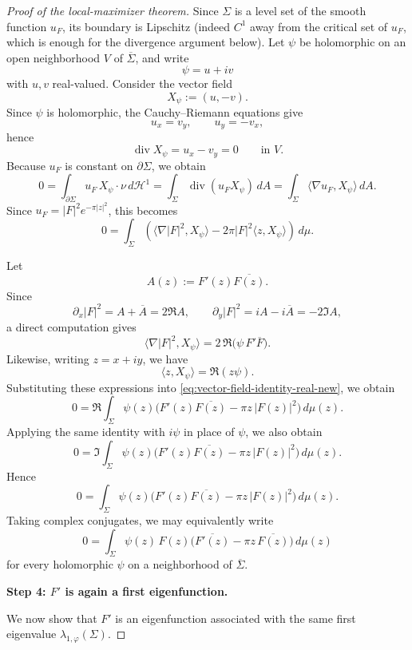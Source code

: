 \documentclass[a4paper,11pt,reqno]{amsart}
\numberwithin{equation}{section}
\theoremstyle{plain} %
\theoremstyle{definition} %
\theoremstyle{remark}
\begin{document}
\begin{proof}[Proof of the local-maximizer theorem]
Since \(\Sigma\) is a level set of the smooth function \(u_F\), its boundary is
Lipschitz (indeed \(C^1\) away from the critical set of \(u_F\), which is enough
for the divergence argument below). Let \(\psi\) be holomorphic on an open
neighborhood \(V\) of \(\overline \Sigma\), and write
\[
\psi=u+iv
\]
with \(u,v\) real-valued. Consider the vector field
\[
X_\psi:=(u,-v).
\]
Since \(\psi\) is holomorphic, the Cauchy--Riemann equations give
\[
u_x=v_y,
\qquad
u_y=-v_x,
\]
hence
\[
\operatorname{div}X_\psi=u_x-v_y=0
\qquad \text{in }V.
\]
Because \(u_F\) is constant on \(\partial \Sigma\), we obtain
\[
0=\int_{\partial \Sigma} u_F\, X_\psi\cdot \nu\, d\mathcal H^1
 =\int_\Sigma \operatorname{div}(u_F X_\psi)\,dA
 =\int_\Sigma \langle \nabla u_F, X_\psi\rangle\,dA.
\]
Since \(u_F=|F|^2e^{-\pi |z|^2}\), this becomes
\begin{equation}\label{eq:vector-field-identity-real-new}
0=
\int_\Sigma
\left(
\langle \nabla |F|^2,X_\psi\rangle
-
2\pi |F|^2 \langle z,X_\psi\rangle
\right)
\,d\mu.
\end{equation}

Let
\[
A(z):=F'(z)\overline{F(z)}.
\]
Since
\[
\partial_x |F|^2 = A+\overline A = 2\Re A,
\qquad
\partial_y |F|^2 = iA-i\overline A = -2\Im A,
\]
a direct computation gives
\[
\langle \nabla |F|^2,X_\psi\rangle
=
2\,\Re\!\big(\psi\,F'\overline{F}\big).
\]
Likewise, writing \(z=x+iy\), we have
\[
\langle z,X_\psi\rangle
=
\Re(z\psi).
\]
Substituting these expressions into
\eqref{eq:vector-field-identity-real-new}, we obtain
\[
0=
\Re\!\int_\Sigma
\psi(z)\Big(F'(z)\overline{F(z)}-\pi z\,|F(z)|^2\Big)\,d\mu(z).
\]
Applying the same identity with \(i\psi\) in place of \(\psi\), we also obtain
\[
0=
\Im\!\int_\Sigma
\psi(z)\Big(F'(z)\overline{F(z)}-\pi z\,|F(z)|^2\Big)\,d\mu(z).
\]
Hence
\begin{equation}\label{eq:orthogonality-main-new}
0=
\int_\Sigma
\psi(z)\Big(F'(z)\overline{F(z)}-\pi z\,|F(z)|^2\Big)\,d\mu(z).
\end{equation}
Taking complex conjugates, we may equivalently write
\[
0=
\int_\Sigma
\psi(z)\,F(z)\Big(\overline{F'(z)}-\pi z\,\overline{F(z)}\Big)\,d\mu(z)
\]
for every holomorphic \(\psi\) on a neighborhood of \(\overline \Sigma\).

\medskip
\noindent
{\bf Step 4: \(F'\) is again a first eigenfunction.}

We now show that \(F'\) is an eigenfunction associated with the same first
eigenvalue \(\lambda_{1,\varphi}(\Sigma)\).


\end{proof}
\end{document}
